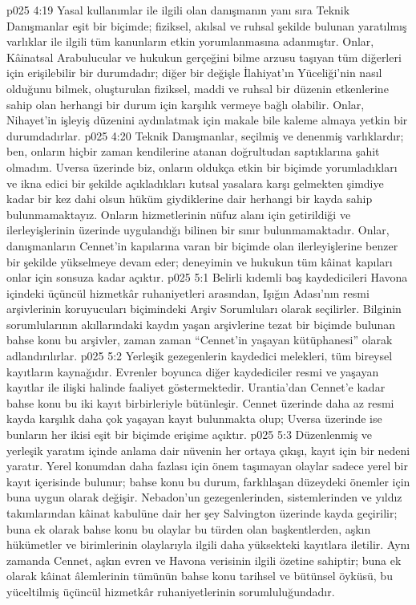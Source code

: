 \vs p025 4:19 Yasal kullanımlar ile ilgili olan danışmanın yanı sıra Teknik Danışmanlar eşit bir biçimde; fiziksel, akılsal ve ruhsal şekilde bulunan yaratılmış varlıklar ile ilgili tüm kanunların etkin yorumlanmasına adanmıştır. Onlar, Kâinatsal Arabulucular ve hukukun gerçeğini bilme arzusu taşıyan tüm diğerleri için erişilebilir bir durumdadır; diğer bir değişle İlahiyat’ın Yüceliği’nin nasıl olduğunu bilmek, oluşturulan fiziksel, maddi ve ruhsal bir düzenin etkenlerine sahip olan herhangi bir durum için karşılık vermeye bağlı olabilir. Onlar, Nihayet’in işleyiş düzenini aydınlatmak için makale bile kaleme almaya yetkin bir durumdadırlar.
\vs p025 4:20 Teknik Danışmanlar, seçilmiş ve denenmiş varlıklardır; ben, onların hiçbir zaman kendilerine atanan doğrultudan saptıklarına şahit olmadım. Uversa üzerinde biz, onların oldukça etkin bir biçimde yorumladıkları ve ikna edici bir şekilde açıkladıkları kutsal yasalara karşı gelmekten şimdiye kadar bir kez dahi olsun hüküm giydiklerine dair herhangi bir kayda sahip bulunmamaktayız. Onların hizmetlerinin nüfuz alanı için getirildiği ve ilerleyişlerinin üzerinde uygulandığı bilinen bir sınır bulunmamaktadır. Onlar, danışmanların Cennet’in kapılarına varan bir biçimde olan ilerleyişlerine benzer bir şekilde yükselmeye devam eder; deneyimin ve hukukun tüm kâinat kapıları onlar için sonsuza kadar açıktır.
\vs p025 5:1 Belirli kıdemli baş kaydedicileri Havona içindeki üçüncül hizmetkâr ruhaniyetleri arasından, Işığın Adası’nın resmi arşivlerinin koruyucuları biçimindeki Arşiv Sorumluları olarak seçilirler. Bilginin sorumlularının akıllarındaki kaydın yaşan arşivlerine tezat bir biçimde bulunan bahse konu bu arşivler, zaman zaman “Cennet’in yaşayan kütüphanesi” olarak adlandırılırlar.
\vs p025 5:2 Yerleşik gezegenlerin kaydedici melekleri, tüm bireysel kayıtların kaynağıdır. Evrenler boyunca diğer kaydediciler resmi ve yaşayan kayıtlar ile ilişki halinde faaliyet göstermektedir. Urantia’dan Cennet’e kadar bahse konu bu iki kayıt birbirleriyle bütünleşir. Cennet üzerinde daha az resmi kayda karşılık daha çok yaşayan kayıt bulunmakta olup; Uversa üzerinde ise bunların her ikisi eşit bir biçimde erişime açıktır.
\vs p025 5:3 Düzenlenmiş ve yerleşik yaratım içinde anlama dair nüvenin her ortaya çıkışı, kayıt için bir nedeni yaratır. Yerel konumdan daha fazlası için önem taşımayan olaylar sadece yerel bir kayıt içerisinde bulunur; bahse konu bu durum, farklılaşan düzeydeki önemler için buna uygun olarak değişir. Nebadon’un gezegenlerinden, sistemlerinden ve yıldız takımlarından kâinat kabulüne dair her şey Salvington üzerinde kayda geçirilir; buna ek olarak bahse konu bu olaylar bu türden olan başkentlerden, aşkın hükümetler ve birimlerinin olaylarıyla ilgili daha yüksekteki kayıtlara iletilir. Aynı zamanda Cennet, aşkın evren ve Havona verisinin ilgili özetine sahiptir; buna ek olarak kâinat âlemlerinin tümünün bahse konu tarihsel ve bütünsel öyküsü, bu yüceltilmiş üçüncül hizmetkâr ruhaniyetlerinin sorumluluğundadır.
